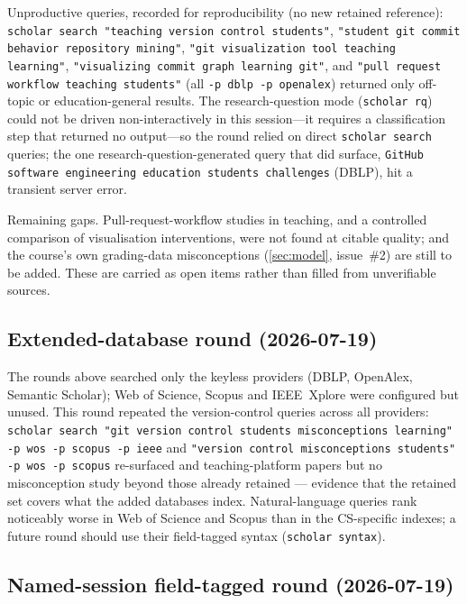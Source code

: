 Unproductive queries, recorded for reproducibility (no new retained
reference): \texttt{scholar search "teaching version control students"},
\texttt{"student git commit behavior repository mining"}, \texttt{"git
visualization tool teaching learning"}, \texttt{"visualizing commit graph
learning git"}, and \texttt{"pull request workflow teaching students"} (all
\texttt{-p dblp -p openalex}) returned only off-topic or education-general
results.
The research-question mode (\texttt{scholar rq}) could not be driven
non-interactively in this session---it requires a classification step that
returned no output---so the round relied on direct \texttt{scholar search}
queries; the one research-question-generated query that did surface,
\texttt{GitHub software engineering education students challenges} (DBLP), hit
a transient server error.

Remaining gaps.
Pull-request-workflow studies in teaching, and a controlled comparison of
visualisation interventions, were not found at citable quality; and the
course's own grading-data misconceptions (\cref{sec:model}, issue~\#2) are
still to be added.
These are carried as open items rather than filled from unverifiable sources.

\subsection{Extended-database round (2026-07-19)}

The rounds above searched only the keyless providers (DBLP, OpenAlex,
Semantic Scholar); Web of Science, Scopus and IEEE~Xplore were configured
but unused.
This round repeated the version-control queries across all providers:
\texttt{scholar search "git version control students misconceptions
learning" -p wos -p scopus -p ieee} and \texttt{"version control
misconceptions students" -p wos -p scopus} re-surfaced
\autocite{IsomottonenCochez2014} and teaching-platform papers but no
misconception study beyond those already retained --- evidence that the
retained set covers what the added databases index.
Natural-language queries rank noticeably worse in Web of Science and
Scopus than in the CS-specific indexes; a future round should use their
field-tagged syntax (\texttt{scholar syntax}).

\subsection{Named-session field-tagged round (2026-07-19)}

